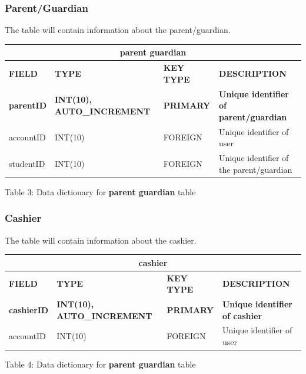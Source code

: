 \documentclass[11pt,a4paper,titlepage]{article}
\begin{document}
\subsubsection{Parent/Guardian}

The table will contain information about the parent/guardian.

\vspace{1cm}
\begin{longtable}{ |p{2.5cm}|p{4.5cm}|p{2.5cm}|p{3cm}|  }
    \hline
    \multicolumn{4}{|c|}{\textbf{parent guardian}} \\
    \hline
    \textbf{FIELD}&\textbf{TYPE}&\textbf{KEY TYPE}&\textbf{DESCRIPTION}\\
    \hline
    \textbf{parentID}   & \textbf{INT(10), AUTO\_INCREMENT}  & \textbf{PRIMARY} & \textbf{Unique identifier of parent/guardian}\\ \hline
    accountID& INT(10) & FOREIGN & Unique identifier of user \\ \hline
    studentID& INT(10) & FOREIGN & Unique identifier of the parent/guardian\\ \hline
\end{longtable}

\vspace{.5cm}
\begin{center}
    Table 3: Data dictionary for \textbf{parent guardian} table
\end{center}

\subsubsection{Cashier}

The table will contain information about the cashier.

\vspace{1cm}
\begin{longtable}{ |p{2.5cm}|p{4.5cm}|p{2.5cm}|p{3cm}|  }
    \hline
    \multicolumn{4}{|c|}{\textbf{cashier}} \\
    \hline
    \textbf{FIELD}&\textbf{TYPE}&\textbf{KEY TYPE}&\textbf{DESCRIPTION}\\
    \hline
    \textbf{cashierID}   & \textbf{INT(10), AUTO\_INCREMENT}  & \textbf{PRIMARY} & \textbf{Unique identifier of cashier}\\ \hline
    accountID& INT(10) & FOREIGN & Unique identifier of user \\ \hline
\end{longtable}

\vspace{.5cm}
\begin{center}
    Table 4: Data dictionary for \textbf{parent guardian} table
\end{center}
\end{document}
